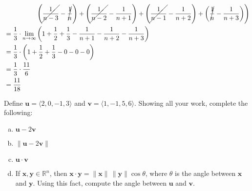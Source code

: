\documentclass[11pt,letterpaper]{article}
\begin{document}
\begin{enumerate}
\[\begin{aligned}
	& \phantom{-----} \left. \left( \cancel{\dfrac{1}{n - 3}} - \cancel{\dfrac{1}{n}} \right) + \left( \cancel{\dfrac{1}{n - 2}} - \dfrac{1}{n + 1} \right) + \left( \cancel{\dfrac{1}{n - 1}} - \dfrac{1}{n + 2} \right) + \left( \cancel{\dfrac{1}{n}} - \dfrac{1}{n + 3} \right) \right) \\
	&= \dfrac{1}{3} \cdot \lim_{n \to \infty} \left( 1+ \dfrac{1}{2} + \dfrac{1}{3} - \dfrac{1}{n + 1} - \dfrac{1}{n + 2} - \dfrac{1}{n + 3} \right) \\
	&= \dfrac{1}{3} \cdot \left(1 + \dfrac{1}{2} + \dfrac{1}{3} - 0 - 0 - 0 \right) \\
	&= \dfrac{1}{3} \cdot \dfrac{11}{6} \\
	&= \dfrac{11}{18}
	\end{aligned}
	\]
\end{enumerate}



\newpage



 Define $\mathbf{u}= \langle 2, 0, -1, 3 \rangle$ and $\mathbf{v}= \langle 1, -1, 5, 6 \rangle$. Showing all your work, complete the following:
	\begin{enumerate}[(a)]
	\item $\mathbf{u} - 2 \mathbf{v}$
	\item $\| \mathbf{u} - 2\mathbf{v} \|$
	\item $\mathbf{u} \cdot \mathbf{v}$
	\item If $\mathbf{x}, \mathbf{y} \in \mathbb{R}^n$, then $\mathbf{x} \cdot \mathbf{y}= \| \mathbf{x} \| \, \| \mathbf{y} \| \cos \theta$, where $\theta$ is the angle between $\mathbf{x}$ and $\mathbf{y}$. Using this fact, compute the angle between $\mathbf{u}$ and $\mathbf{v}$. 
	\end{enumerate} \pspace
\end{document}
